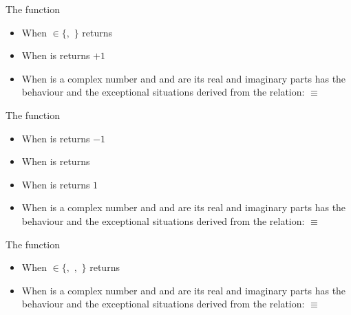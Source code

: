 \documentclass[../Exponentials-Logarithms-Trigonometry.tex]{subfiles}
\begin{document}
\noindent
The function 
\begin{itemize}
  \item When  $\in \{$$,$
  $\}$ returns 
  \item When  is  returns $+1$
  \item When  is a complex number and   and 
  are its real and imaginary parts has the behaviour and the exceptional
  situations derived from the relation: \code{)}
  $\equiv$ \code{ (-
  }\code{)))}
\end{itemize}

\noindent
The function 
\begin{itemize}
  \item When  is  returns
  $-1$
  \item When  is  returns 
  \item When  is  returns
  $1$
  \item When  is a complex number and   and 
  are its real and imaginary parts has the behaviour and the exceptional
  situations derived from the relation: \code{)}
  $\equiv$ \code{ (-
  }\code{)))}
\end{itemize}

\noindent
The function 
\begin{itemize}
  \item When  $\in \{$$,$
  $,$ $\}$ returns 
  \item When  is a complex number and   and 
  are its real and imaginary parts has the behaviour and the exceptional
  situations derived from the relation: \code{)}
  $\equiv$ \code{ (-
  }\code{)))}
\end{itemize}
\end{document}

